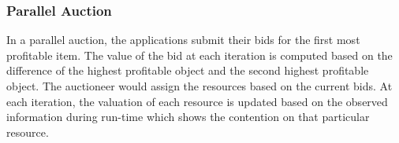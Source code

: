 \subsubsection{Parallel Auction}
In a parallel auction, the applications submit their bids for the first most profitable item. The value of the bid at each iteration is computed based on the difference of the highest profitable object and the second highest profitable object. The auctioneer would assign the resources based on the current bids. At each iteration, the valuation of each resource is updated based on the observed information during run-time which shows the contention on that particular resource.
